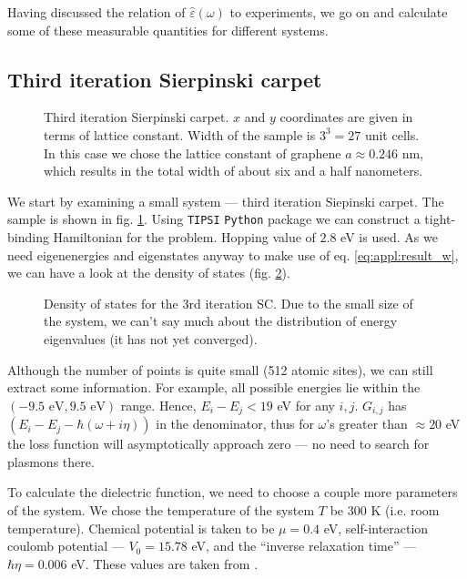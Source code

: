\documentclass[a4paper,12pt]{article}
\begin{document}
    Having discussed the relation of $\hat\varepsilon(\omega)$ to experiments, we go on and calculate some of these measurable quantities for different systems.

\subsection{Third iteration Sierpinski carpet}
    \begin{figure}[h]
    
    \caption{Third iteration Sierpinski carpet. $x$ and $y$ coordinates are given in terms of lattice constant. Width of the sample is $3^3 = 27$ unit cells. In this case we chose the lattice constant of graphene $a \approx 0.246$ nm, which results in the total width of about six and a half nanometers.}
    \label{fig:coordinates-3rd-SC}
    \end{figure}
    We start by examining a small system --- third iteration Siepinski carpet. The sample is shown in fig. \ref{fig:coordinates-3rd-SC}. Using \texttt{TIPSI} \texttt{Python} package we can construct a tight-binding Hamiltonian for the problem. Hopping value of $2.8$ eV is used. As we need eigenenergies and eigenstates anyway to make use of eq. \eqref{eq:appl:result_w}, we can have a look at the density of states (fig. \ref{fig:dos-3rd-SC}). 
    \begin{figure}
    \center
    
    \caption{Density of states for the 3rd iteration SC. Due to the small size of the system, we can't say much about the distribution of energy eigenvalues (it has not yet converged).}
    \label{fig:dos-3rd-SC}
    \end{figure}
    Although the number of points is quite small (512 atomic sites), we can still extract some information. For example, all possible energies lie within the $(-9.5\text{ eV}, 9.5\text{ eV})$ range. Hence, $E_i - E_j < 19$ eV for any $i, j$. $G_{i,j}$ has $(E_i - E_j - \hbar(\omega + i\eta))$ in the denominator, thus for $\omega$'s greater than $\approx20$ eV the loss function will asymptotically approach zero --- no need to search for plasmons there.

    To calculate the dielectric function, we need to choose a couple more parameters of the system. We chose the temperature of the system $T$ be $300$ K (i.e. room temperature). Chemical potential is taken to be $\mu = 0.4$ eV, self-interaction coulomb potential --- $V_0 = 15.78$ eV, and the ``inverse relaxation time'' --- $\hbar\eta = 0.006$ eV. These values are taken from \cite{plasmonic2015}.
    
\end{document}
